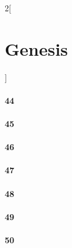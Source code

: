 \documentclass{book}
\begin{document}
\begin{multicols}{2}[\part{Genesis}]
\subsection*{44}
\subsection*{45}
\subsection*{46}
\subsection*{47}
\subsection*{48}
\subsection*{49}
\subsection*{50}
\end{multicols}
\end{document}

